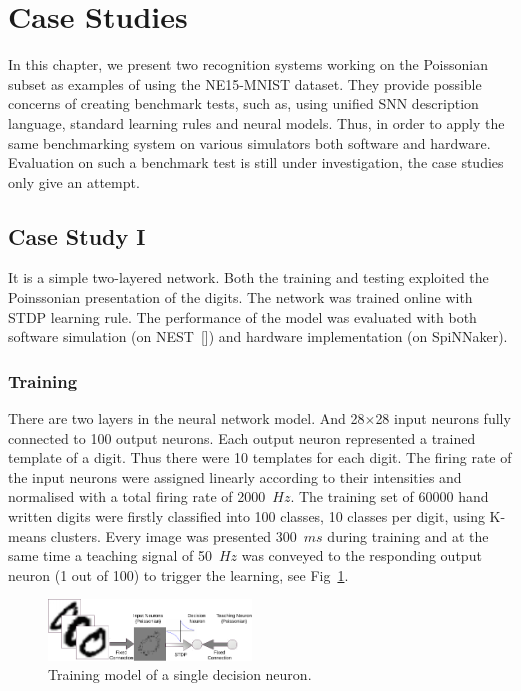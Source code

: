 \section{Case Studies}
\label{sec:test}
In this chapter, we present two recognition systems working on the Poissonian subset as examples of using the NE15-MNIST dataset.
They provide possible concerns of creating benchmark tests, such as, using unified SNN description language, standard learning rules and neural models.
Thus, in order to apply the same benchmarking system on various simulators both software and hardware.
Evaluation on such a benchmark test is still under investigation, the case studies only give an attempt.

\subsection{Case Study I}
It is a simple two-layered network.
Both the training and testing exploited the Poinssonian presentation of the digits.
The network was trained online with STDP learning rule.
The performance of the model was evaluated with both software simulation (on NEST~[\cite{gewaltig2007nest}]) and hardware implementation (on SpiNNaker). 
\subsubsection{Training}
There are two layers in the neural network model.
And 28$\times$28 input neurons fully connected to 100 output neurons.
Each output neuron represented a trained template of a digit.
Thus there were 10 templates for each digit.
The firing rate of the input neurons were assigned linearly according to their intensities and normalised with a total firing rate of 2000~$Hz$.
The training set of 60000 hand written digits were firstly classified into 100 classes, 10 classes per digit, using K-means clusters.
Every image was presented 300~$ms$ during training and at the same time a teaching signal of 50~$Hz$ was conveyed to the responding output neuron (1 out of 100) to trigger the learning, see Fig~\ref{Fig:train}.
\begin{figure}[hbt!]
	\centering
	\includegraphics[width=0.48\textwidth]{images/training.pdf}
	\caption{Training model of a single decision neuron.}
	\label{Fig:train}
\end{figure} 

